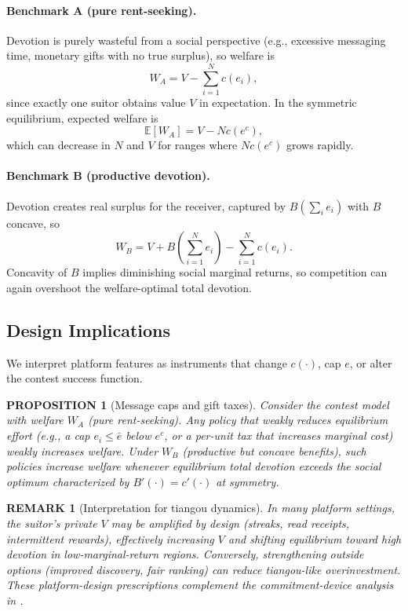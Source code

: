 \documentclass[AER]{AEA}
\newtheorem{proposition}{PROPOSITION}
\newtheorem{remark}{REMARK}
\begin{document}
\paragraph{Benchmark A (pure rent-seeking).} Devotion is purely wasteful from a social
perspective (e.g., excessive messaging time, monetary gifts with no true surplus), so
welfare is
\begin{equation}
  W_A = V - \sum_{i=1}^N c(e_i),
\end{equation}
since exactly one suitor obtains value $V$ in expectation. In the symmetric equilibrium,
expected welfare is
\begin{equation}
  \mathbb{E}[W_A] = V - Nc(e^c),
\end{equation}
which can decrease in $N$ and $V$ for ranges where $Nc(e^c)$ grows rapidly.

\paragraph{Benchmark B (productive devotion).} Devotion creates real surplus for the
receiver, captured by $B\!\left(\sum_i e_i\right)$ with $B$ concave, so
\begin{equation}
  W_B = V + B\!\left(\sum_{i=1}^N e_i\right) - \sum_{i=1}^N c(e_i).
\end{equation}
Concavity of $B$ implies diminishing social marginal returns, so competition can again
overshoot the welfare-optimal total devotion.

\subsection{Design Implications}

We interpret platform features as instruments that change $c(\cdot)$, cap $e$, or alter
the contest success function.

\begin{proposition}[Message caps and gift taxes]\label{prop:policy}
  Consider the contest model with welfare $W_A$ (pure rent-seeking). Any policy that
  weakly reduces equilibrium effort (e.g., a cap $e_i \leq \bar{e}$ below $e^c$, or a
  per-unit tax that increases marginal cost) weakly increases welfare. Under $W_B$
  (productive but concave benefits), such policies increase welfare whenever equilibrium
  total devotion exceeds the social optimum characterized by $B'(\cdot) = c'(\cdot)$ at
  symmetry.
\end{proposition}

\begin{remark}[Interpretation for tiangou dynamics]\label{rem:platform}
  In many platform settings, the suitor's private $V$ may be amplified by design (streaks,
  read receipts, intermittent rewards), effectively increasing $V$ and shifting equilibrium
  toward high devotion in low-marginal-return regions. Conversely, strengthening outside
  options (improved discovery, fair ranking) can reduce tiangou-like overinvestment. These
  platform-design prescriptions complement the commitment-device analysis in
  \citet{Price2026}.
\end{remark}
\end{document}
